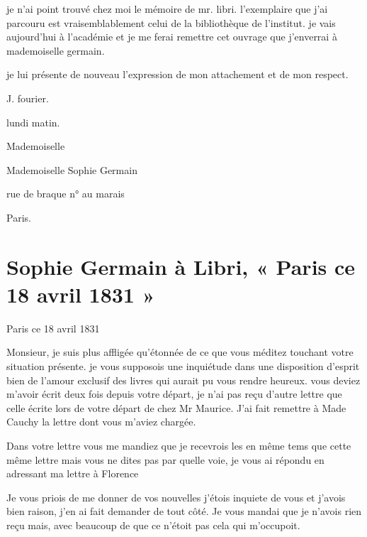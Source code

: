 \documentclass[11pt,a4paper]{article}
\begin{document}
je n'ai point trouvé chez moi le mémoire de mr. libri. l'exemplaire que j'ai
parcouru est vraisemblablement celui de la bibliothèque de l'institut. je
vais aujourd'hui à l'académie et je me ferai remettre cet ouvrage que
j'enverrai à mademoiselle germain.

je lui présente de nouveau l'expression de mon attachement et de mon respect.

J. fourier.

lundi matin.

Mademoiselle

Mademoiselle Sophie Germain

rue de braque n°  au marais

Paris.


\section{Sophie Germain à Libri, « Paris ce 18 avril 1831 »}

Paris ce 18 avril 1831

Monsieur, je suis plus \ill{} affligée qu'étonnée de ce que vous méditez
touchant votre situation présente. je vous supposois une inquiétude dans une
disposition d'esprit bien  de l'amour exclusif des livres
qui aurait pu vous rendre heureux. vous deviez m'avoir écrit deux fois depuis
votre départ, je n'ai pas reçu d'autre lettre que celle écrite lors de votre
départ de chez Mr Maurice. J'ai fait remettre à Made Cauchy la lettre dont
vous m'aviez chargée.


Dans votre lettre vous me mandiez que je recevrois les  en
même tems que cette même lettre mais vous ne dites pas par quelle voie, je
vous ai répondu en adressant ma lettre à Florence


Je vous priois de me donner de vos nouvelles \struck{\ill{}} j'étois inquiete
de vous et j'avois bien raison, j'en ai fait demander de tout côté. Je vous
mandai \struck{\ill{}} que je n'avois rien reçu mais, avec beaucoup de
 que ce n'étoit pas cela qui m'occupoit.
\end{document}
